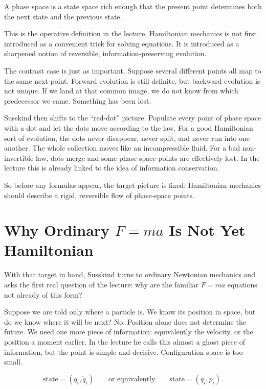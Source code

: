 \begin{definition}
A phase space is a state space rich enough that the present point determines both the next state and the previous state.
\end{definition}

This is the operative definition in the lecture. Hamiltonian mechanics is not first introduced as a convenient trick for solving equations. It is introduced as a sharpened notion of reversible, information-preserving evolution.

The contrast case is just as important. Suppose several different points all map to the same next point. Forward evolution is still definite, but backward evolution is not unique. If we land at that common image, we do not know from which predecessor we came. Something has been lost.

Susskind then shifts to the ``red-dot'' picture. Populate every point of phase space with a dot and let the dots move according to the law. For a good Hamiltonian sort of evolution, the dots never disappear, never split, and never run into one another. The whole collection moves like an incompressible fluid. For a bad non-invertible law, dots merge and some phase-space points are effectively lost. In the lecture this is already linked to the idea of information conservation.

So before any formulas appear, the target picture is fixed: Hamiltonian mechanics should describe a rigid, reversible flow of phase-space points.

\section{Why Ordinary \(F=ma\) Is Not Yet Hamiltonian}

With that target in hand, Susskind turns to ordinary Newtonian mechanics and asks the first real question of the lecture: why are the familiar \(F=ma\) equations not already of this form?

Suppose we are told only where a particle is. We know its position in space, but do we know where it will be next? No. Position alone does not determine the future. We need one more piece of information: equivalently the velocity, or the position a moment earlier. In the lecture he calls this almost a ghost piece of information, but the point is simple and decisive. Configuration space is too small.

\begin{equation}
\text{state}=(q_i,\dot q_i)
\qquad \text{or equivalently} \qquad
\text{state}=(q_i,p_i).
\end{equation}

